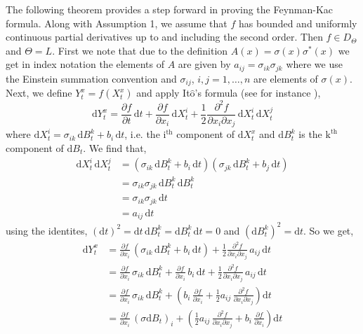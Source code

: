 \documentclass[a4paper,12pt,draft]{report}
\begin{document}
The following theorem provides a step forward in proving the Feynman-Kac formula.
\theorem
{
Along with Assumption 1, we assume that $f$ has bounded and uniformly continuous partial derivatives up to and including the second order.  Then $f \in D_\Theta$ and $\Theta = L$.
}
\proof
{
First we note that due to the definition $A(x) = \sigma(x)\sigma^*(x)$ we get in index notation the elements of $A$ are given by $a_{ij} = \sigma_{ik}\sigma_{jk}$ where we use the Einstein summation convention and $\sigma_{ij}$, $i, j = 1, \dots, n$ are elements of $\sigma(x)$.  Next, we define $Y_t^x = f(X_t^x)$ and apply It$\mathrm{\hat{o}}$'s formula (see for instance \cite{Oksendal}),
$$
\mathrm{d}Y_t^x = \frac{\partial f}{\partial t}\,\mathrm{d}t + \frac{\partial f}{\partial x_i}\,\mathrm{d}X_t^i + \frac{1}{2}\frac{\partial^2 f}{\partial x_i \partial x_j}\,\mathrm{d}X_t^i\,\mathrm{d}X_t^j
$$
where $\mathrm{d}X_t^i = \sigma_{ik}\,\mathrm{d}B_t^k + b_i\,\mathrm{d}t$, i.e. the $\mathrm{i^{th}}$ component of $\mathrm{d}X_t^x$ and $\mathrm{d}B_t^k$ is the $\mathrm{k^{th}}$ component of $\mathrm{d}B_t$.  We find that,
\begin{align}
\mathrm{d}X_t^i\,\mathrm{d}X_t^j & = (\sigma_{ik}\,\mathrm{d}B_t^k + b_i\,\mathrm{d}t)(\sigma_{jk}\,\mathrm{d}B_t^k + b_j\,\mathrm{d}t)\nonumber\\
& = \sigma_{ik}\sigma_{jk}\,\mathrm{d}B_t^k\,\mathrm{d}B_t^k\nonumber\\
& = \sigma_{ik}\sigma_{jk}\,\mathrm{d}t\nonumber\\
& = a_{ij}\,\mathrm{d}t\nonumber
\end{align}
using the identites, $(\mathrm{d}t)^2 = \mathrm{d}t\,\mathrm{d}B_t^k = \mathrm{d}B_t^k\,\mathrm{d}t = 0$ and $(\mathrm{d}B_t^k)^2 = \mathrm{d}t$.  So we get,
\begin{align}
\mathrm{d}Y_t^x & = \frac{\partial f}{\partial x_i}\,(\sigma_{ik}\,\mathrm{d}B_t^k + b_i\,\mathrm{d}t) + \frac{1}{2}\frac{\partial^2 f}{\partial x_i \partial x_j}\,a_{ij}\,\mathrm{d}t\nonumber\\
& = \frac{\partial f}{\partial x_i}\,\sigma_{ik}\,\mathrm{d}B_t^k + \frac{\partial f}{\partial x_i}\,b_i\,\mathrm{d}t + \frac{1}{2}\frac{\partial^2 f}{\partial x_i \partial x_j}\,a_{ij}\,\mathrm{d}t\nonumber\\
& = \frac{\partial f}{\partial x_i}\,\sigma_{ik}\,\mathrm{d}B_t^k + \left(b_i\,\frac{\partial f}{\partial x_i} + \frac{1}{2}a_{ij}\,\frac{\partial^2 f}{\partial x_i \partial x_j}\right)\mathrm{d}t\nonumber\\
& = \frac{\partial f}{\partial x_i}\,(\sigma\mathrm{d}B_t)_i + \left(\frac{1}{2}a_{ij}\,\frac{\partial^2 f}{\partial x_i \partial x_j} + b_i\,\frac{\partial f}{\partial x_i}\right)\mathrm{d}t\nonumber\\

\end{align}}
\end{document}
